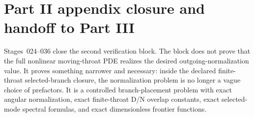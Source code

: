 \begingroup
\let\clearpage\relax
\clearpage

\clearpage

\clearpage

\clearpage

\clearpage

\clearpage

\clearpage

\clearpage

\clearpage

\clearpage

\clearpage

\clearpage

\clearpage

\endgroup

\section{Part II appendix closure and handoff to Part III}
\label{sec:app-part02-closure}

Stages~024--036 close the second verification block.  The block does not prove that the full nonlinear moving-throat PDE realizes the desired outgoing-normalization value.  It proves something narrower and necessary: inside the declared finite-throat selected-branch closure, the normalization problem is no longer a vague choice of prefactors.  It is a controlled branch-placement problem with exact angular normalization, exact finite-throat D/N overlap constants, exact selected-mode spectral formulas, and exact dimensionless frontier functions.

